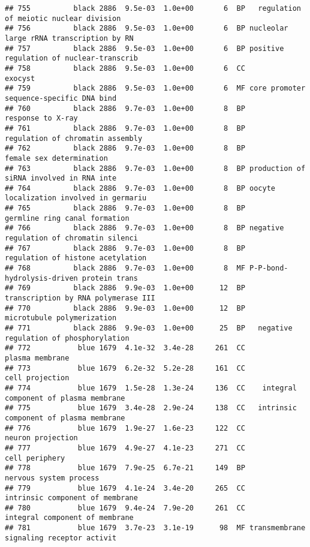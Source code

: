 \documentclass[]{article}
\begin{document}
\begin{verbatim}
## 755          black 2886  9.5e-03  1.0e+00       6  BP   regulation of meiotic nuclear division
## 756          black 2886  9.5e-03  1.0e+00       6  BP nucleolar large rRNA transcription by RN
## 757          black 2886  9.5e-03  1.0e+00       6  BP positive regulation of nuclear-transcrib
## 758          black 2886  9.5e-03  1.0e+00       6  CC                                  exocyst
## 759          black 2886  9.5e-03  1.0e+00       6  MF core promoter sequence-specific DNA bind
## 760          black 2886  9.7e-03  1.0e+00       8  BP                        response to X-ray
## 761          black 2886  9.7e-03  1.0e+00       8  BP         regulation of chromatin assembly
## 762          black 2886  9.7e-03  1.0e+00       8  BP                 female sex determination
## 763          black 2886  9.7e-03  1.0e+00       8  BP production of siRNA involved in RNA inte
## 764          black 2886  9.7e-03  1.0e+00       8  BP oocyte localization involved in germariu
## 765          black 2886  9.7e-03  1.0e+00       8  BP            germline ring canal formation
## 766          black 2886  9.7e-03  1.0e+00       8  BP negative regulation of chromatin silenci
## 767          black 2886  9.7e-03  1.0e+00       8  BP        regulation of histone acetylation
## 768          black 2886  9.7e-03  1.0e+00       8  MF P-P-bond-hydrolysis-driven protein trans
## 769          black 2886  9.9e-03  1.0e+00      12  BP      transcription by RNA polymerase III
## 770          black 2886  9.9e-03  1.0e+00      12  BP               microtubule polymerization
## 771          black 2886  9.9e-03  1.0e+00      25  BP   negative regulation of phosphorylation
## 772           blue 1679  4.1e-32  3.4e-28     261  CC                          plasma membrane
## 773           blue 1679  6.2e-32  5.2e-28     161  CC                          cell projection
## 774           blue 1679  1.5e-28  1.3e-24     136  CC    integral component of plasma membrane
## 775           blue 1679  3.4e-28  2.9e-24     138  CC   intrinsic component of plasma membrane
## 776           blue 1679  1.9e-27  1.6e-23     122  CC                        neuron projection
## 777           blue 1679  4.9e-27  4.1e-23     271  CC                           cell periphery
## 778           blue 1679  7.9e-25  6.7e-21     149  BP                   nervous system process
## 779           blue 1679  4.1e-24  3.4e-20     265  CC          intrinsic component of membrane
## 780           blue 1679  9.4e-24  7.9e-20     261  CC           integral component of membrane
## 781           blue 1679  3.7e-23  3.1e-19      98  MF transmembrane signaling receptor activit

\end{verbatim}
\end{document}
